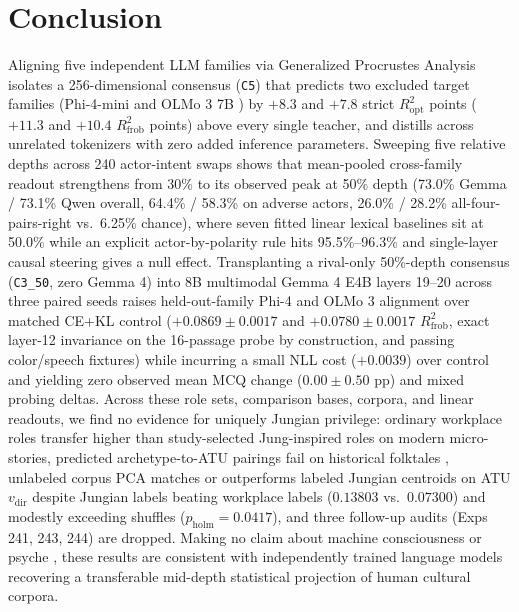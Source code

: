 \documentclass[conference]{IEEEtran}
\begin{document}
\section{Conclusion}
\label{sec:conclusion}
Aligning five independent LLM families via Generalized Procrustes Analysis \cite{gower1975gpa,cheng2026platoskey} isolates a 256-dimensional consensus (\texttt{C5}) that predicts two excluded target families (Phi-4-mini \cite{abouelenin2025phi4mini} and OLMo 3 7B \cite{olmo2025olmo3}) by $+8.3$ and $+7.8$ strict $R^2_{\text{opt}}$ points ($+11.3$ and $+10.4$ $R^2_{\text{frob}}$ points) above every single teacher, and distills across unrelated tokenizers with zero added inference parameters. Sweeping five relative depths across 240 actor-intent swaps shows that mean-pooled cross-family readout strengthens from 30\% to its observed peak at 50\% depth (73.0\% Gemma / 73.1\% Qwen overall, 64.4\% / 58.3\% on adverse actors, 26.0\% / 28.2\% all-four-pairs-right vs.\ 6.25\% chance), where seven fitted linear lexical baselines sit at 50.0\% while an explicit actor-by-polarity rule hits 95.5\%--96.3\% and single-layer causal steering gives a null effect. Transplanting a rival-only 50\%-depth consensus (\texttt{C3\_50}, zero Gemma 4) into 8B multimodal Gemma 4 E4B \cite{gemmateam2026gemma4} layers 19--20 across three paired seeds raises held-out-family Phi-4 and OLMo 3 alignment over matched CE+KL control ($+0.0869\pm0.0017$ and $+0.0780\pm0.0017$ $R^2_{\text{frob}}$, exact layer-12 invariance on the 16-passage probe by construction, and passing color/speech fixtures) while incurring a small NLL cost ($+0.0039$) over control and yielding zero observed mean MCQ change ($0.00\pm0.50$ pp) and mixed probing deltas. Across these role sets, comparison bases, corpora, and linear readouts, we find no evidence for uniquely Jungian privilege: ordinary workplace roles transfer higher than study-selected Jung-inspired roles on modern micro-stories, predicted archetype-to-ATU pairings fail on historical folktales \cite{hagedorn2022bearing,uther2004types}, unlabeled corpus PCA matches or outperforms labeled Jungian centroids on ATU $v_{\text{dir}}$ despite Jungian labels beating workplace labels ($0.13803$ vs.\ $0.07300$) and modestly exceeding shuffles ($p_{\text{holm}}=0.0417$), and three follow-up audits (Exps 241, 243, 244) are dropped. Making no claim about machine consciousness or psyche \cite{butlin2023consciousness,shanahan2024talking}, these results are consistent with independently trained language models recovering a transferable mid-depth statistical projection of human cultural corpora.

\FloatBarrier


\end{document}
